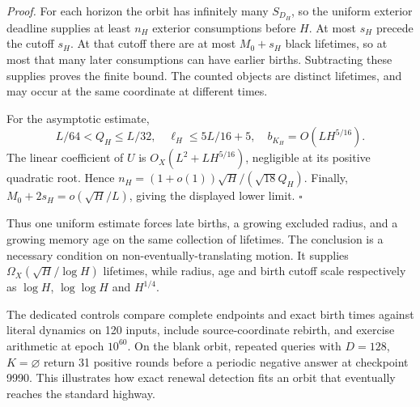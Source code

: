 \textit{Proof.}
For each horizon the orbit has infinitely many \(S_{D_H}\), so the uniform
exterior deadline supplies at least \(n_H\) exterior consumptions before
\(H\). At most \(s_H\) precede the cutoff \(s_H\). At that cutoff there
are at most \(M_0+s_H\) black lifetimes, so at most that many later
consumptions can have earlier births. Subtracting these supplies proves
the finite bound. The counted objects are distinct lifetimes, and may occur
at the same coordinate at different times.

For the asymptotic estimate,
\[
 L/64<Q_H\le L/32,\quad
 \ell_H\le5L/16+5,\quad b_{K_H}=O(LH^{5/16}).
\]
The linear coefficient of \(U\) is
\(O_X(L^2+LH^{5/16})\), negligible at its positive quadratic root. Hence
\(n_H=(1+o(1))\sqrt H/(\sqrt{18}Q_H)\). Finally,
\(M_0+2s_H=o(\sqrt H/L)\), giving the displayed lower limit.
\(\square\)

Thus one uniform estimate forces late births, a growing excluded radius, and
a growing memory age on the same collection of lifetimes. The conclusion is
a necessary condition on non-eventually-translating motion. It supplies
\(\Omega_X(\sqrt H/\log H)\) lifetimes, while radius, age and birth cutoff
scale respectively as \(\log H\), \(\log\log H\) and \(H^{1/4}\).

The dedicated controls compare complete endpoints and exact birth times
against literal dynamics on 120 inputs, include source-coordinate rebirth,
and exercise arithmetic at epoch \(10^{60}\). On the blank orbit, repeated
queries with \(D=128\), \(K=\varnothing\) return 31 positive rounds before
a periodic negative answer at checkpoint 9990. This illustrates how exact
renewal detection fits an orbit that eventually reaches the standard highway.

